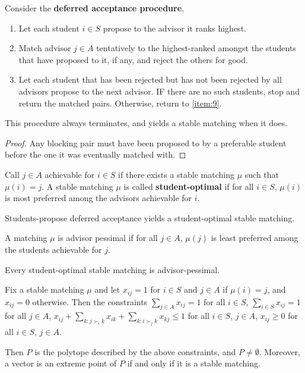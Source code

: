 \begin{thm}
  \label{sec:stable-matchings-2}
  Consider the \textbf{deferred acceptance procedure},
  \begin{enumerate}
  \item Let each student $i \in S$ propose to the advisor it ranks highest.
  \item\label{item:9} Match advisor $j \in A$ tentatively to the highest-ranked
    amongst the students that have proposed to it, if any, and reject
    the others for good.
  \item Let each student that has been rejected but has not been
    rejected by all advisors propose to the next advisor. IF there are
    no such students, stop and return the matched pairs.  Otherwise,
    return to \ref{item:9}.
  \end{enumerate}

  This procedure always terminates, and yields a stable matching when
  it does.
\end{thm}

\begin{proof}
  Any blocking pair must have been proposed to by a preferable student
  before the one it was eventually matched with.
\end{proof}

\begin{thm}
  \label{sec:stable-matchings-3}
  Call $j \in A$ achievable for $i \in S$ if there exists a stable
  matching $\mu$ such that $\mu(i) = j$.  A stable matching $\mu$
  is called  \textbf{student-optimal} if for all $i \in S$, $\mu(i)$
  is most preferred among the advisors achievable for $i$.

  Students-propose deferred acceptance yields a student-optimal stable matching.
\end{thm}

\begin{thm}
  \label{sec:stable-matchings-4}
  A matching $\mu$ is advisor pessimal if for all $j \in A$, $\mu(j)$
  is least preferred among the students achievable for $j$.

  Every student-optimal stable matching is advisor-pessimal.
\end{thm}

\begin{thm}
  \label{sec:stable-matchings-5}
  Fix a stable matching $\mu$ and let $x_{ij} = 1$ for $i \in S$ and
  $j \in A$ if $\mu(i) = j$, and $x_{ij} = 0$ otherwise.  Then the
  constraints $\sum_{j \in A}^{} x_{ij} = 1$ for all $i \in S$,
  $\sum_{i \in S}^{} x_{ij} = 1$ for all $j \in A$, $x_{ij} + \sum_{k:
  j \succ_{i} k}^{} x_{ik} + \sum_{k: i \succ_{j} k}^{} x_{kj}
\leq 1$ for all $i \in S$, $j \in A$, $x_{ij} \geq 0$ for all $i \in
S$, $j \in A$.

Then $P$ is the polytope described by the above constraints, and $P
\neq \emptyset$.  Moreover, a vector is an extreme point of $P$ if and
only if it is a stable matching.
\end{thm}


